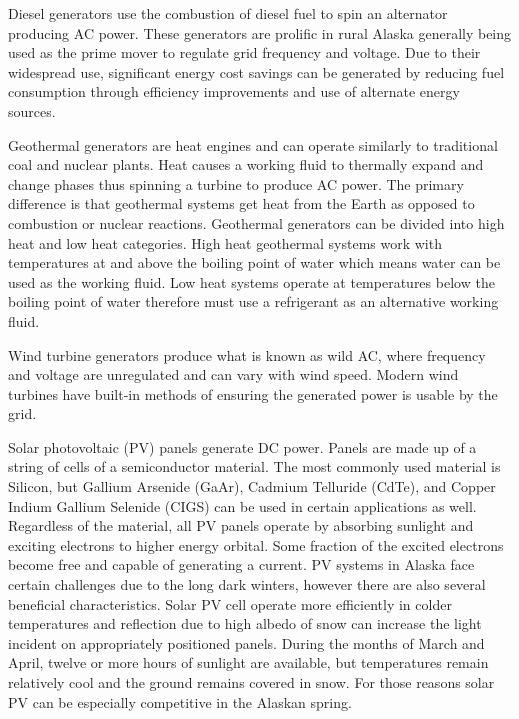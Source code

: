 Diesel generators use the combustion of diesel fuel to spin an alternator producing AC power. These generators are prolific in rural Alaska generally being used as the prime mover to regulate grid frequency and voltage. 
Due to their widespread use, significant energy cost savings can be generated by reducing fuel consumption through efficiency improvements and use of alternate energy sources.

Geothermal generators are heat engines and can operate similarly to traditional coal and nuclear plants. Heat causes a working fluid to thermally expand and change phases thus spinning a turbine to produce AC power. The primary difference is that geothermal systems get heat from the Earth as opposed to combustion or nuclear reactions. Geothermal generators can be divided into high heat and low heat categories. High heat geothermal systems work with temperatures at and above the boiling point of water which means water can be used as the working fluid. Low heat systems operate at temperatures below the boiling point of water therefore must use a refrigerant as an alternative working fluid. 

Wind turbine generators produce what is known as wild AC, where frequency and voltage are unregulated and can vary with wind speed. Modern wind turbines have built-in methods of ensuring the generated power is usable by the grid.

Solar photovoltaic (PV) panels generate DC power. Panels are made up of a string of cells of a semiconductor material. The most commonly used material is Silicon, but Gallium Arsenide (GaAr), Cadmium Telluride (CdTe), and Copper Indium Gallium Selenide (CIGS) can be used in certain applications as well. Regardless of the material, all PV panels operate by absorbing sunlight and exciting electrons to higher energy orbital. Some fraction of the excited electrons become free and capable of generating a current. PV systems in Alaska face certain challenges due to the long dark winters, however there are also several beneficial characteristics. Solar PV cell operate more efficiently in colder temperatures and reflection due to high albedo of snow can increase the light incident on appropriately positioned panels. During the months of March and April, twelve or more hours of sunlight are available, but temperatures remain relatively cool and the ground remains covered in snow. For those reasons solar PV can be especially competitive in the Alaskan spring.

